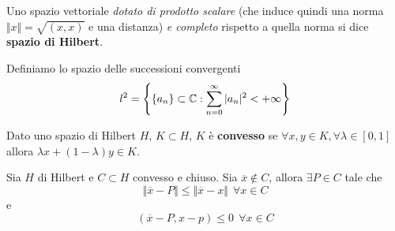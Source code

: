 \begin{defn}
Uno spazio vettoriale \textit{dotato di prodotto scalare} (che induce quindi una norma $ \Vert x \Vert = \sqrt{(x, x)}$ e una distanza) \textit{e completo} rispetto a quella norma si dice \textbf{spazio di Hilbert}.
\end{defn}
\begin{defn}
Definiamo lo spazio delle successioni convergenti
\begin{equation*}
l^{2} = \left\{\{a_{n}\} \subset \mathbb{C} : \sum\limits^{\infty}_{n = 0}| a_{n}|^{2} < + \infty \right\}
\end{equation*}
\end{defn}
\begin{defn}
Dato uno spazio di Hilbert $H$, $K\subset H$, $K$ è \textbf{convesso} se $\forall x, y\in K, \forall \lambda \in [0, 1]$ allora $\lambda x + (1 - \lambda) y\in K$.
\end{defn}
\begin{thm}
[di proiezione]
Sia $H$ di Hilbert e $C\subset H$ convesso e chiuso. Sia $\overline{x} \notin C$, allora $\exists P\in C$ tale che
\begin{equation*}
\Vert \overline{x} - P \Vert \leq \Vert \overline{x} - x \Vert \ \ \forall x\in C
\end{equation*}
e
\begin{equation*}
(\overline{x} - P, x - p) \leq 0\ \ \forall x\in C
\end{equation*}
\end{thm}


